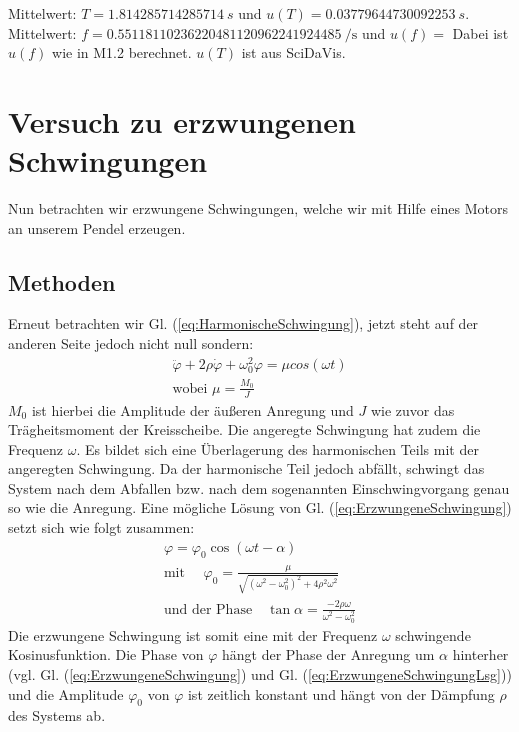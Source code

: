 \documentclass[11pt,a4paper,titlepage, ngerman]{article}
\newcommand{\refeq}[1]{Gl. (\ref{eq:#1})}
\begin{document}
		Mittelwert: $T = \SI{1,814285714285714}{s}$ und $u(T) = \SI{0,03779644730092253}{s}$.\\
		Mittelwert: $f = \SI{0,55118110236220481120962241924485}{\per\second}$ und $u(f) = $
		Dabei ist $u(f)$ wie in M1.2 berechnet. $u(T)$ ist aus SciDaVis.
		
	\section{Versuch zu erzwungenen Schwingungen}
	
		Nun betrachten wir erzwungene Schwingungen, welche wir mit Hilfe eines Motors an unserem Pendel erzeugen.
			
		\subsection*{Methoden}
			
			Erneut betrachten wir \refeq{HarmonischeSchwingung}, jetzt steht auf der anderen Seite jedoch nicht null sondern:
			\begin{align}
				\ddot{\varphi}+2\rho\dot{\varphi}+\omega_0^2\varphi= \mu cos(\omega t) \label{eq:ErzwungeneSchwingung}\\
				\text{wobei } \mu = \frac{M_0}{J}
			\end{align}
			$M_0$ ist hierbei die Amplitude der äußeren Anregung und $J$ wie zuvor das Trägheitsmoment der Kreisscheibe. Die angeregte Schwingung hat zudem die Frequenz $\omega$.
			Es bildet sich eine Überlagerung des harmonischen Teils mit der angeregten Schwingung. Da der harmonische Teil jedoch abfällt, schwingt das System nach dem Abfallen bzw. nach dem sogenannten Einschwingvorgang genau so wie die Anregung.
			Eine mögliche Lösung von \refeq{ErzwungeneSchwingung} setzt sich wie folgt zusammen:
			\begin{align}
				\varphi = \varphi_0 \cos{(\omega t-\alpha)} \label{eq:ErzwungeneSchwingungLsg}\\
				\text{mit } \quad \varphi_0 = \frac{\mu}{\sqrt{(\omega^2-\omega_0^2)^2+4\rho^2\omega^2}} \label{eq:ErzwungeneSchwingungAmp}\\
				\text{und der Phase} \quad \tan{\alpha} = \frac{-2\rho\omega}{\omega^2-\omega_0^2}
			\end{align}
			Die erzwungene Schwingung ist somit eine mit der Frequenz $\omega$ schwingende Kosinusfunktion. Die Phase von $\varphi$ hängt der Phase der Anregung um $\alpha$ hinterher (vgl. \refeq{ErzwungeneSchwingung} und \refeq{ErzwungeneSchwingungLsg}) und die Amplitude $\varphi_0$ von $\varphi$ ist zeitlich konstant und hängt von der Dämpfung $\rho$ des Systems ab.
			
\end{document}
